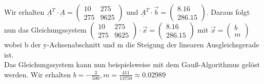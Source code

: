     \newline %
    \newline
    Wir erhalten $\underline{A}^T \cdot \underline{A} = \begin{pmatrix}
      10 & 275\\ 
      275 & 9625
    \end{pmatrix}$ 
    und $\underline{A}^T \cdot \vec{b} =  \begin{pmatrix}
      8.16\\ 
      286.15
    \end{pmatrix}$.
    \newline
    \noindent Daraus folgt nun das Gleichungssystem 
    $\begin{pmatrix}
      10 & 275\\ 
      275 & 9625
    \end{pmatrix}
    \cdot \vec{x}
    = \begin{pmatrix}
      8.16\\ 
      286.15
    \end{pmatrix}$
    mit $\vec{x} = \begin{pmatrix}
      b\\ 
      m
    \end{pmatrix}$
    wobei b der y-Achsenabschnitt und m die Steigung der linearen Ausgleichsgerade ist.\\
    \noindent Das Gleichungssystem kann nun beispielsweise mit dem Gauß-Algorithmus gelöst werden. Wir erhalten $b = -\frac{3}{500}, m = \frac{411}{13750} \approx 0.02989$